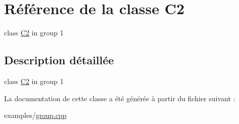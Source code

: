 \hypertarget{class_c2}{}\section{Référence de la classe C2}
\label{class_c2}


class \hyperlink{class_c2}{C2} in group 1  




\subsection{Description détaillée}
class \hyperlink{class_c2}{C2} in group 1 

La documentation de cette classe a été générée à partir du fichier suivant \+:\begin{DoxyCompactItemize}
\item 
examples/\hyperlink{group_8cpp}{group.\+cpp}\end{DoxyCompactItemize}
